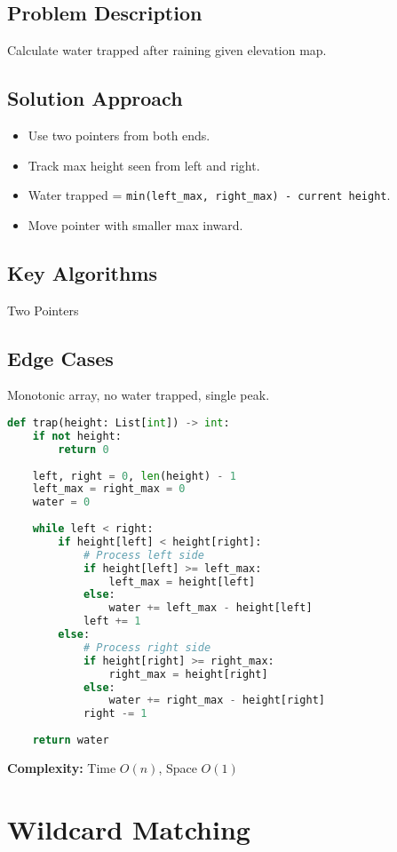 \documentclass[10pt, a4paper]{article}
\begin{document}
\subsection*{Problem Description}
Calculate water trapped after raining given elevation map.

\subsection*{Solution Approach}
\begin{itemize}
    \item Use two pointers from both ends.
    \item Track max height seen from left and right.
    \item Water trapped = \texttt{min(left\_max, right\_max) - current height}.
    \item Move pointer with smaller max inward.
\end{itemize}

\subsection*{Key Algorithms}
Two Pointers

\subsection*{Edge Cases}
Monotonic array, no water trapped, single peak.

\begin{lstlisting}[language=Python]
def trap(height: List[int]) -> int:
    if not height:
        return 0
    
    left, right = 0, len(height) - 1
    left_max = right_max = 0
    water = 0
    
    while left < right:
        if height[left] < height[right]:
            # Process left side
            if height[left] >= left_max:
                left_max = height[left]
            else:
                water += left_max - height[left]
            left += 1
        else:
            # Process right side
            if height[right] >= right_max:
                right_max = height[right]
            else:
                water += right_max - height[right]
            right -= 1
    
    return water
\end{lstlisting}
\textbf{Complexity:} Time $O(n)$, Space $O(1)$

\section{Wildcard Matching}
\end{document}
